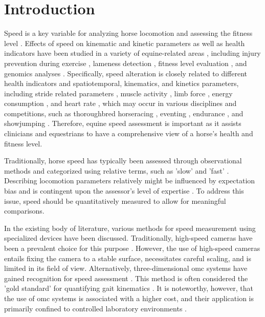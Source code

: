 \section{Introduction}
\label{sec:intro_introduction_speed}


Speed is a key variable for analyzing horse locomotion and assessing the fitness level \cite{meira_2014_speed,witte_2004_accuracy}. Effects of speed on kinematic and kinetic parameters as well as health indicators have been studied in a variety of equine-related areas \cite{robert_2002_effects,weishaupt,allen_2015_evaluation}, including injury prevention during exercise \cite{williams_2019_the}, lameness detection \cite{moorman_2017_the,9216873}, fitness level evaluation \cite{witte_2006_effect,munsters_2014_exercise}, and genomics analyses \cite{meira_2014_speed,farries_2019_analysis}. Specifically, speed alteration is closely related to different health indicators and spatiotemporal, kinematics, and kinetics parameters, including stride related parameters \cite{robert_2002_effects,heglund_1988_speed,weishaupt,allen_2015_evaluation}, muscle activity \cite{robert_2002_effects}, limb force \cite{witte_2006_effect}, energy consumption \cite{heglund_1988_speed}, and heart rate \cite{kingston_2006_use,allen_2015_evaluation,bazzano_2016_application,fonseca_2010_the,vermeulen_2006_measurements,williams_2019_the,younes_2015_speed}, which may occur in various disciplines and competitions, such as thoroughbred horseracing \cite{kingston_2006_use,vermeulen_2006_measurements,spence_2012_speed,han_2020_selection}, eventing \cite{munsters_2014_exercise}, endurance \cite{marlin_2018_equine,parkes_2019_the,bennet_2018_fdration,nagy_2010_elimination,younes_2015_speed}, and showjumping \cite{bazzano_2016_application,Schmutz2020}. Therefore, equine speed assessment is important as it assists clinicians and equestrians to have a comprehensive view of a horse's health and fitness level.

Traditionally, horse speed has typically been assessed through observational methods and categorized using relative terms, such as 'slow' and 'fast' \cite{enschede_kwpn}. Describing locomotion parameters relatively might be influenced by expectation bias \cite{knigvonborstel_2011_towards} and is contingent upon the assessor's level of expertise \cite{articlevisual,GMEL2020102932}. To address this issue, speed should be quantitatively measured to allow for meaningful comparisons.

In the existing body of literature, various methods for speed measurement using specialized devices have been discussed. Traditionally, high-speed cameras have been a prevalent choice for this purpose \cite{fredricson_1980_the,ratzlaff_1985_the}. However, the use of high-speed cameras entails fixing the camera to a stable surface, necessitates careful scaling, and is limited in its field of view. Alternatively, three-dimensional \gls{omc} systems have gained recognition for speed assessment \cite{ericson_2020_the}. This method is often considered the 'gold standard' for quantifying gait kinematics \cite{pfau_2005_a}. It is noteworthy, however, that the use of \gls{omc} systems is associated with a higher cost, and their application is primarily confined to controlled laboratory environments \cite{5409556}. 

